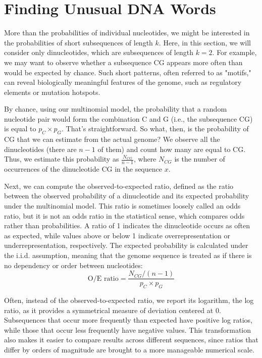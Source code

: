 \section*{Finding Unusual DNA Words}

More than the probabilities of individual nucleotides, we might be interested in the probabilities of short subsequences of length $k$. Here, in this section, we will consider only dinucleotides, which are subsequences of length $k=2$. For example, we may want to observe whether a subsequence CG appears more often than would be expected by chance. Such short patterns, often referred to as "motifs," can reveal biologically meaningful features of the genome, such as regulatory elements or mutation hotspots.

By chance, using our multinomial model, the probability that a random nucleotide pair would form the combination C and G (i.e., the subsequence CG) is equal to $p_C \times p_G$. That’s straightforward. So what, then, is the probability of CG that we can estimate from the actual genome? We observe all the dinucleotides (there are $n - 1$ of them) and count how many are equal to CG. Thus, we estimate this probability as $\frac{N_{CG}}{n - 1}$, where $N_{CG}$ is the number of occurrences of the dinucleotide CG in the sequence $x$.

Next, we can compute the observed-to-expected ratio, defined as the ratio between the observed probability of a dinucleotide and its expected probability under the multinomial model. This ratio is sometimes loosely called an odds ratio, but it is not an odds ratio in the statistical sense, which compares odds rather than probabilities. A ratio of 1 indicates the dinucleotide occurs as often as expected, while values above or below 1 indicate overrepresentation or underrepresentation, respectively. The expected probability is calculated under the i.i.d. assumption, meaning that the genome sequence is treated as if there is no dependency or order between nucleotides:
\[
\text{O/E ratio} = \frac{N_{CG}/(n-1)}{p_C \times p_G}
\]

Often, instead of the observed-to-expected ratio, we report its logarithm, the log ratio, as it provides a symmetrical measure of deviation centered at 0. Subsequences that occur more frequently than expected have positive log ratios, while those that occur less frequently have negative values. This transformation also makes it easier to compare results across different sequences, since ratios that differ by orders of magnitude are brought to a more manageable numerical scale.

